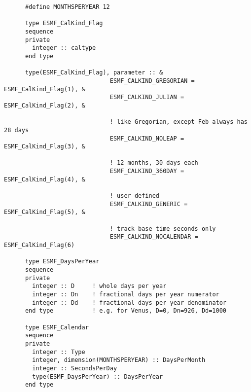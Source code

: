 \begin{verbatim}
      #define MONTHSPERYEAR 12

      type ESMF_CalKind_Flag
      sequence
      private
        integer :: caltype
      end type

      type(ESMF_CalKind_Flag), parameter :: &
                              ESMF_CALKIND_GREGORIAN =  ESMF_CalKind_Flag(1), &
                              ESMF_CALKIND_JULIAN =     ESMF_CalKind_Flag(2), &

                              ! like Gregorian, except Feb always has 28 days
                              ESMF_CALKIND_NOLEAP =     ESMF_CalKind_Flag(3), &

                              ! 12 months, 30 days each
                              ESMF_CALKIND_360DAY =     ESMF_CalKind_Flag(4), &

                              ! user defined
                              ESMF_CALKIND_GENERIC =    ESMF_CalKind_Flag(5), &

                              ! track base time seconds only
                              ESMF_CALKIND_NOCALENDAR = ESMF_CalKind_Flag(6)

      type ESMF_DaysPerYear
      sequence
      private
        integer :: D     ! whole days per year
        integer :: Dn    ! fractional days per year numerator
        integer :: Dd    ! fractional days per year denominator
      end type           ! e.g. for Venus, D=0, Dn=926, Dd=1000

      type ESMF_Calendar
      sequence
      private
        integer :: Type
        integer, dimension(MONTHSPERYEAR) :: DaysPerMonth
        integer :: SecondsPerDay
        type(ESMF_DaysPerYear) :: DaysPerYear
      end type
\end{verbatim}
